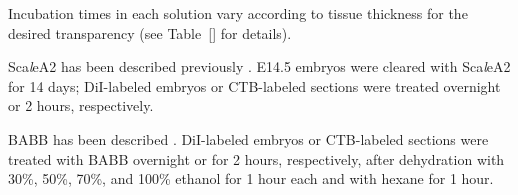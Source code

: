 Incubation times in each solution vary according to tissue thickness for the desired transparency (see Table~\ref{} for details).

Sca\emph{l}eA2 has been described previously \cite{hama2011scale}.
E14.5 embryos were cleared with Sca\emph{l}eA2 for 14 days; DiI-labeled embryos or CTB-labeled sections were treated overnight or 2 hours, respectively.

BABB has been described \cite{dodt2007ultramicroscopy}.
DiI-labeled embryos or CTB-labeled sections were treated with BABB overnight or for 2 hours, respectively, after dehydration with 30\%, 50\%, 70\%, and 100\% ethanol for 1 hour each and with hexane for 1 hour.